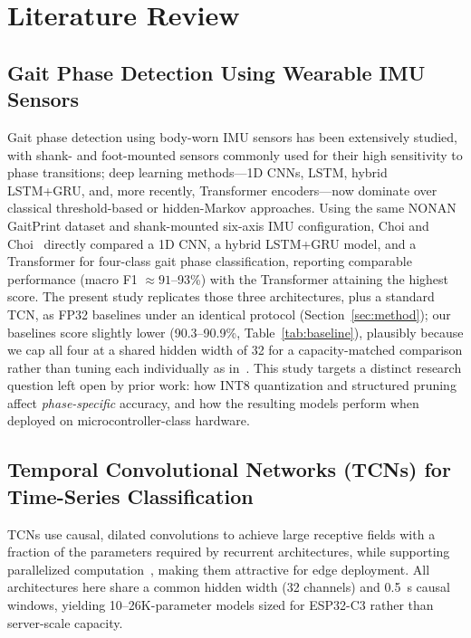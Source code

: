 \documentclass[conference]{IEEEtran}
\begin{document}
\section{Literature Review}
\label{sec:litreview}

\subsection{Gait Phase Detection Using Wearable IMU Sensors}

Gait phase detection using body-worn IMU sensors has been extensively studied, with shank- and
foot-mounted sensors commonly used for their high sensitivity to phase transitions; deep learning
methods---1D CNNs, LSTM, hybrid LSTM+GRU, and, more recently, Transformer encoders---now dominate
over classical threshold-based or hidden-Markov approaches. Using the same NONAN GaitPrint dataset
and shank-mounted six-axis IMU configuration, Choi and Choi~\cite{ref1} directly compared a 1D CNN,
a hybrid LSTM+GRU model, and a Transformer for four-class gait phase classification, reporting
comparable performance (macro F1 ${\approx}91$--93\%) with the Transformer attaining the highest
score. The present study replicates those three architectures, plus a standard TCN, as FP32
baselines under an identical protocol (Section~\ref{sec:method}); our baselines score slightly
lower (90.3--90.9\%, Table~\ref{tab:baseline}), plausibly because we cap all four at a shared hidden
width of 32 for a capacity-matched comparison rather than tuning each individually as
in~\cite{ref1}. This study targets a distinct research question left open by prior work: how INT8
quantization and structured pruning affect \emph{phase-specific} accuracy, and how the resulting
models perform when deployed on microcontroller-class hardware.

\subsection{Temporal Convolutional Networks (TCNs) for Time-Series Classification}

TCNs use causal, dilated convolutions to achieve large receptive fields with a fraction of the
parameters required by recurrent architectures, while supporting parallelized
computation~\cite{ref2}, making them attractive for edge deployment. All architectures here share a
common hidden width (32 channels) and 0.5~s causal windows, yielding 10--26K-parameter models sized
for ESP32-C3 rather than server-scale capacity.
\end{document}
